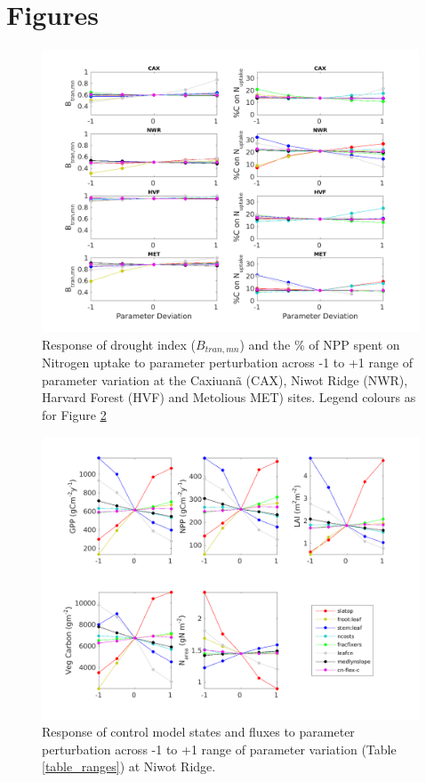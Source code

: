 \usepackage{}\documentclass[draft,linenumbers]{agujournal}
\begin{document}
\section{Figures}
\begin{figure}[h]
     \includegraphics[width=1.2\textwidth]{matlab/figures/MAY19jp_MEANCOND_-r200_1999.png}
     \caption{Response of drought index ($B_{tran,mn}$) and the \% of NPP spent on Nitrogen uptake to parameter perturbation across -1 to +1 range of parameter variation at the Caxiuan\~a (CAX), Niwot Ridge (NWR), Harvard Forest (HVF) and Metolious MET) sites. Legend colours as for Figure \ref{NR1 state}}
     \label{btran state}
 \end{figure}
 
 \begin{figure}[h]
     \includegraphics[width=1.2\textwidth]{matlab/figures/MAY19jp_STATE_-r200_NWR_y2000.png}
     \caption{Response of control model states and fluxes to parameter perturbation across -1 to +1 range of parameter variation (Table \ref{table_ranges}) at Niwot Ridge.}
     \label{NR1 state}
 \end{figure}
\end{document}
